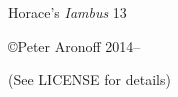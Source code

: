 \begin{titlepage}

\begin{center}

\huge Horace's \textit{Iambus} 13

\vskip2in

\large \copyright Peter Aronoff 2014--\the\year

(See LICENSE for details)

\newpage

\end{center}

\end{titlepage}
